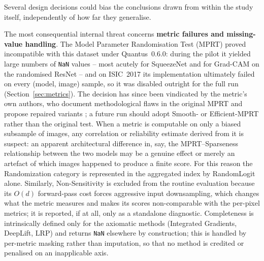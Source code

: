 Several design decisions could bias the conclusions drawn from within the study
itself, independently of how far they generalise.

The most consequential internal threat concerns \textbf{metric
failures and missing-value handling}. The Model Parameter Randomisation Test
(MPRT) proved incompatible with this dataset under Quantus~0.6.0: during the
pilot it yielded large numbers of \texttt{NaN} values -- most acutely for
SqueezeNet and for Grad-CAM on the randomised ResNet -- and on ISIC~2017 its
implementation ultimately failed on every (model, image) sample, so it was
disabled outright for the full run (Section~\ref{sec:metrics}). The decision
has since been vindicated by the metric's own authors, who document
methodological flaws in the original MPRT and propose repaired variants
\citep{hedstrom2024sanity}; a future run should adopt Smooth- or
Efficient-MPRT rather than the original test. When a metric
is computable on only a biased
subsample of images, any correlation or reliability estimate derived from it is
suspect: an apparent architectural difference in, say, the
MPRT--Sparseness relationship between the two models may be a genuine effect or
merely an artefact of which images happened to produce a finite score. For this
reason the Randomization category is represented in the aggregated index by
RandomLogit alone. Similarly, Non-Sensitivity is
excluded from the routine evaluation because its $O(d)$ forward-pass cost forces
aggressive input downsampling, which changes what the metric measures and makes
its scores non-comparable with the per-pixel metrics; it is reported, if at
all, only as a standalone diagnostic. Completeness is intrinsically defined only
for the axiomatic methods (Integrated Gradients, DeepLift, LRP) and returns
\texttt{NaN} elsewhere by construction; this is handled by per-metric masking
rather than imputation, so that no method is credited or penalised on an
inapplicable axis.

